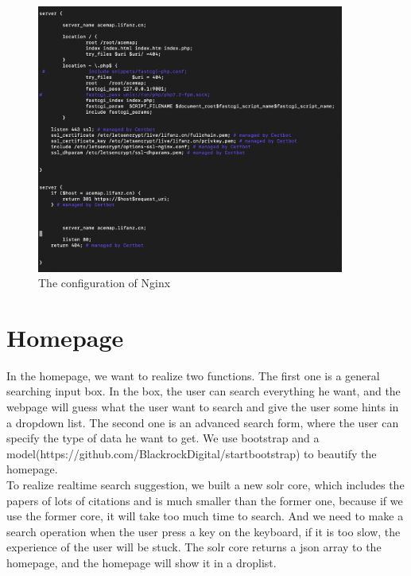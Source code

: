\documentclass{article}
\begin{document}
	\begin{figure}[h]
		\begin{center}
			\includegraphics[width=0.90\textwidth]{zlf_2} %
			\caption{The configuration of Nginx}
		\end{center}
	\end{figure}
	
	\section{Homepage}
	\hspace*{0.5cm}
	In the homepage, we want to realize two functions. The first one is a general searching input box. In the box, the user
	can search everything he want, and the webpage will guess what the user want to search and give the user some hints in a
	dropdown list. The second one is an advanced search form, where the user can specify the type of data he want to get.
	We use bootstrap and a model(https://github.com/BlackrockDigital/startbootstrap) to beautify the homepage.\\
	To realize realtime search suggestion, we built a new solr core, which includes the papers of lots of citations and is much
	smaller than the former one, because if we use the former core, it will take too much time to search. And we need to make
	a search operation when the user press a key on the keyboard, if it is too slow, the experience of the user will be stuck.
	The solr core returns a json array to the homepage, and the homepage will show it in a droplist.
	
\end{document}

